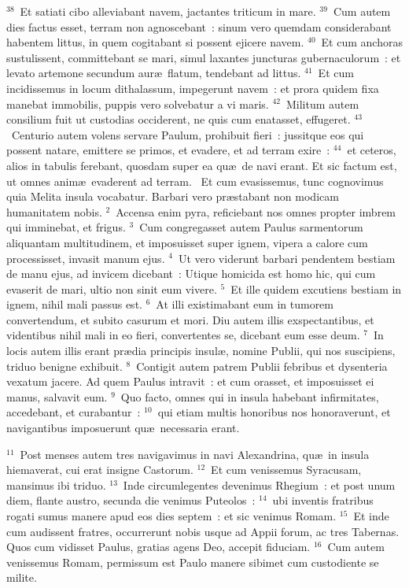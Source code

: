 ${}^{38}$~Et satiati cibo alleviabant navem, jactantes triticum in mare.
${}^{39}$~Cum autem dies factus esset, terram non agnoscebant~: sinum vero quemdam considerabant habentem littus, in quem cogitabant si possent ejicere navem.
${}^{40}$~Et cum anchoras sustulissent, committebant se mari, simul laxantes juncturas gubernaculorum~: et levato artemone secundum aur\ae\ flatum, tendebant ad littus.
${}^{41}$~Et cum incidissemus in locum dithalassum, impegerunt navem~: et prora quidem fixa manebat immobilis, puppis vero solvebatur a vi maris.
${}^{42}$~Militum autem consilium fuit ut custodias occiderent, ne quis cum enatasset, effugeret.
${}^{43}$~Centurio autem volens servare Paulum, prohibuit fieri~: jussitque eos qui possent natare, emittere se primos, et evadere, et ad terram exire~:
${}^{44}$~et ceteros, alios in tabulis ferebant, quosdam super ea qu\ae\ de navi erant. Et sic factum est, ut omnes anim\ae\ evaderent ad terram.
~Et cum evasissemus, tunc cognovimus quia Melita insula vocabatur. Barbari vero pr\ae stabant non modicam humanitatem nobis.
${}^{2}$~Accensa enim pyra, reficiebant nos omnes propter imbrem qui imminebat, et frigus.
${}^{3}$~Cum congregasset autem Paulus sarmentorum aliquantam multitudinem, et imposuisset super ignem, vipera a calore cum processisset, invasit manum ejus.
${}^{4}$~Ut vero viderunt barbari pendentem bestiam de manu ejus, ad invicem dicebant~: Utique homicida est homo hic, qui cum evaserit de mari, ultio non sinit eum vivere.
${}^{5}$~Et ille quidem excutiens bestiam in ignem, nihil mali passus est.
${}^{6}$~At illi existimabant eum in tumorem convertendum, et subito casurum et mori. Diu autem illis exspectantibus, et videntibus nihil mali in eo fieri, convertentes se, dicebant eum esse deum.
${}^{7}$~In locis autem illis erant pr\ae dia principis insul\ae , nomine Publii, qui nos suscipiens, triduo benigne exhibuit.
${}^{8}$~Contigit autem patrem Publii febribus et dysenteria vexatum jacere. Ad quem Paulus intravit~: et cum orasset, et imposuisset ei manus, salvavit eum.
${}^{9}$~Quo facto, omnes qui in insula habebant infirmitates, accedebant, et curabantur~:
${}^{10}$~qui etiam multis honoribus nos honoraverunt, et navigantibus imposuerunt qu\ae\ necessaria erant.


${}^{11}$~Post menses autem tres navigavimus in navi Alexandrina, qu\ae\ in insula hiemaverat, cui erat insigne Castorum.
${}^{12}$~Et cum venissemus Syracusam, mansimus ibi triduo.
${}^{13}$~Inde circumlegentes devenimus Rhegium~: et post unum diem, flante austro, secunda die venimus Puteolos~:
${}^{14}$~ubi inventis fratribus rogati sumus manere apud eos dies septem~: et sic venimus Romam.
${}^{15}$~Et inde cum audissent fratres, occurrerunt nobis usque ad Appii forum, ac tres Tabernas. Quos cum vidisset Paulus, gratias agens Deo, accepit fiduciam.
${}^{16}$~Cum autem venissemus Romam, permissum est Paulo manere sibimet cum custodiente se milite.


